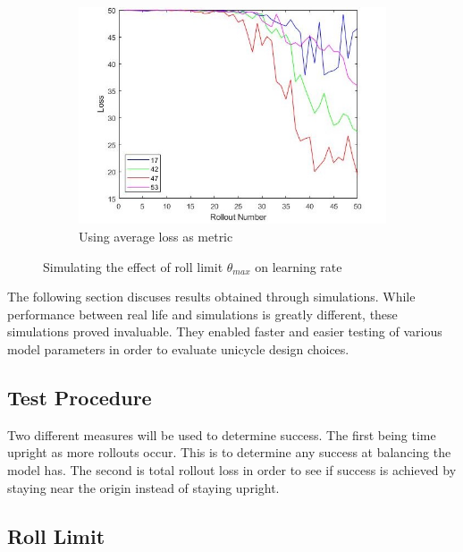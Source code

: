 \documentclass[twoside,twocolumn,12pt]{article}
\begin{document}
\begin{figure}[hb!]
\begin{subfigure}[t]{0.325\textwidth}
    \includegraphics[width=\linewidth]{average_angle_loss}
    \caption{Using average loss as metric}
  \label{fig:rl}
  \end{subfigure}
  \caption{Simulating the effect of roll limit $\theta_{max}$ on learning rate }
  \label{fig:rolllimit}
\end{figure}
The following section discuses results obtained through simulations. While performance between real life and simulations is greatly different, these simulations proved invaluable. They enabled faster and easier testing of various model parameters in order to evaluate unicycle design choices.
\subsection{Test Procedure}

Two different measures will be used to determine success. The first being time upright as more rollouts occur. This is to determine any success at balancing the model has. The second is total rollout loss in order to see if success is achieved by staying near the origin instead of staying upright.
\subsection{Roll Limit}
\end{document}
